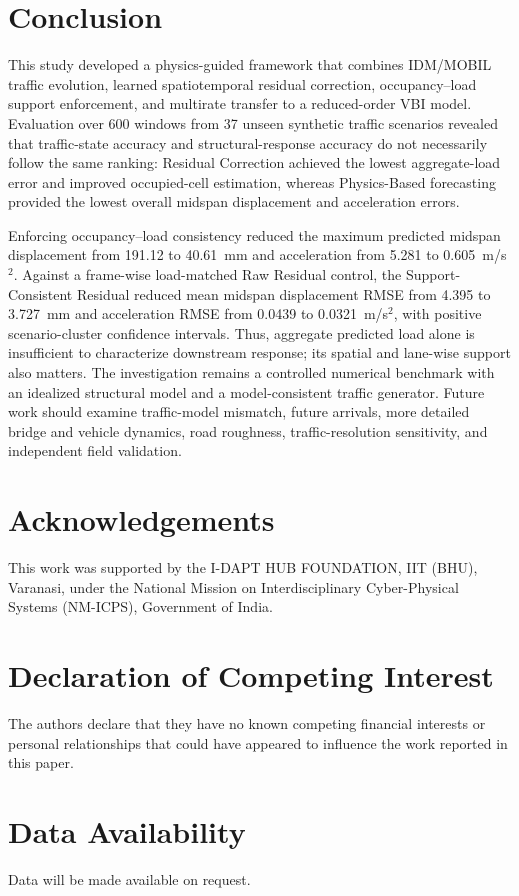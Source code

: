 \documentclass[journal]{IEEEtran}
\begin{document}
\section{Conclusion}

This study developed a physics-guided framework that combines IDM/MOBIL traffic evolution, learned spatiotemporal residual correction, occupancy--load support enforcement, and multirate transfer to a reduced-order VBI model. Evaluation over 600 windows from 37 unseen synthetic traffic scenarios revealed that traffic-state accuracy and structural-response accuracy do not necessarily follow the same ranking: Residual Correction achieved the lowest aggregate-load error and improved occupied-cell estimation, whereas Physics-Based forecasting provided the lowest overall midspan displacement and acceleration errors.

Enforcing occupancy--load consistency reduced the maximum predicted midspan displacement from 191.12 to 40.61~mm and acceleration from 5.281 to 0.605~m/s$^2$. Against a frame-wise load-matched Raw Residual control, the Support-Consistent Residual reduced mean midspan displacement RMSE from 4.395 to 3.727~mm and acceleration RMSE from 0.0439 to 0.0321~m/s$^2$, with positive scenario-cluster confidence intervals. Thus, aggregate predicted load alone is insufficient to characterize downstream response; its spatial and lane-wise support also matters. The investigation remains a controlled numerical benchmark with an idealized structural model and a model-consistent traffic generator. Future work should examine traffic-model mismatch, future arrivals, more detailed bridge and vehicle dynamics, road roughness, traffic-resolution sensitivity, and independent field validation.

\section*{Acknowledgements}

This work was supported by the I-DAPT HUB FOUNDATION,
IIT (BHU), Varanasi, under the National Mission on
Interdisciplinary Cyber-Physical Systems (NM-ICPS),
Government of India.

\section*{Declaration of Competing Interest}

The authors declare that they have no known competing
financial interests or personal relationships that could
have appeared to influence the work reported in this paper.

\section*{Data Availability}

Data will be made available on request.

\FloatBarrier





\end{document}
